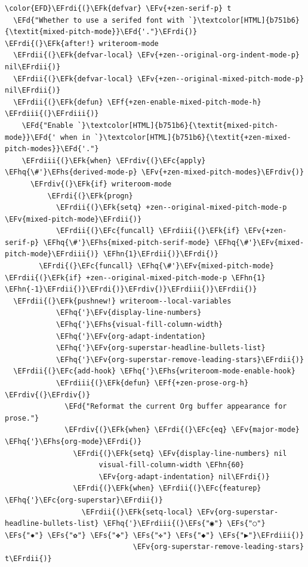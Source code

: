 \documentclass{scrartcl}
\newcommand{\EFk}[1]{\textcolor{EFk}{#1}} %
\newcommand{\EFd}[1]{\textcolor{EFd}{\textit{#1}}} %
\newcommand{\EFs}[1]{\textcolor{EFs}{#1}} %
\newcommand{\EFc}[1]{\textcolor{EFc}{#1}} %
\newcommand{\EFv}[1]{\textcolor{EFv}{#1}} %
\newcommand{\EFf}[1]{\textcolor{EFf}{#1}} %
\newcommand{\EFhn}[1]{\textcolor{EFhn}{\textbf{#1}}} %
\newcommand{\EFhq}[1]{\textcolor{EFhq}{#1}} %
\newcommand{\EFhs}[1]{\textcolor{EFhs}{#1}} %
\newcommand{\EFrdi}[1]{\textcolor{EFrdi}{#1}} %
\newcommand{\EFrdii}[1]{\textcolor{EFrdii}{#1}} %
\newcommand{\EFrdiii}[1]{\textcolor{EFrdiii}{#1}} %
\newcommand{\EFrdiv}[1]{\textcolor{EFrdiv}{#1}} %
\begin{document}
\begin{Code}
\begin{Verbatim}[]
\color{EFD}\EFrdi{(}\EFk{defvar} \EFv{+zen-serif-p} t
  \EFd{"Whether to use a serifed font with `}\textcolor[HTML]{b751b6}{\textit{mixed-pitch-mode}}\EFd{'."}\EFrdi{)}
\EFrdi{(}\EFk{after!} writeroom-mode
  \EFrdii{(}\EFk{defvar-local} \EFv{+zen--original-org-indent-mode-p} nil\EFrdii{)}
  \EFrdii{(}\EFk{defvar-local} \EFv{+zen--original-mixed-pitch-mode-p} nil\EFrdii{)}
  \EFrdii{(}\EFk{defun} \EFf{+zen-enable-mixed-pitch-mode-h} \EFrdiii{(}\EFrdiii{)}
    \EFd{"Enable `}\textcolor[HTML]{b751b6}{\textit{mixed-pitch-mode}}\EFd{' when in `}\textcolor[HTML]{b751b6}{\textit{+zen-mixed-pitch-modes}}\EFd{'."}
    \EFrdiii{(}\EFk{when} \EFrdiv{(}\EFc{apply} \EFhq{\#'}\EFhs{derived-mode-p} \EFv{+zen-mixed-pitch-modes}\EFrdiv{)}
      \EFrdiv{(}\EFk{if} writeroom-mode
          \EFrdi{(}\EFk{progn}
            \EFrdii{(}\EFk{setq} +zen--original-mixed-pitch-mode-p \EFv{mixed-pitch-mode}\EFrdii{)}
            \EFrdii{(}\EFc{funcall} \EFrdiii{(}\EFk{if} \EFv{+zen-serif-p} \EFhq{\#'}\EFhs{mixed-pitch-serif-mode} \EFhq{\#'}\EFv{mixed-pitch-mode}\EFrdiii{)} \EFhn{1}\EFrdii{)}\EFrdi{)}
        \EFrdi{(}\EFc{funcall} \EFhq{\#'}\EFv{mixed-pitch-mode} \EFrdii{(}\EFk{if} +zen--original-mixed-pitch-mode-p \EFhn{1} \EFhn{-1}\EFrdii{)}\EFrdi{)}\EFrdiv{)}\EFrdiii{)}\EFrdii{)}
  \EFrdii{(}\EFk{pushnew!} writeroom--local-variables
            \EFhq{'}\EFv{display-line-numbers}
            \EFhq{'}\EFhs{visual-fill-column-width}
            \EFhq{'}\EFv{org-adapt-indentation}
            \EFhq{'}\EFv{org-superstar-headline-bullets-list}
            \EFhq{'}\EFv{org-superstar-remove-leading-stars}\EFrdii{)}
  \EFrdii{(}\EFc{add-hook} \EFhq{'}\EFhs{writeroom-mode-enable-hook}
            \EFrdiii{(}\EFk{defun} \EFf{+zen-prose-org-h} \EFrdiv{(}\EFrdiv{)}
              \EFd{"Reformat the current Org buffer appearance for prose."}
              \EFrdiv{(}\EFk{when} \EFrdi{(}\EFc{eq} \EFv{major-mode} \EFhq{'}\EFhs{org-mode}\EFrdi{)}
                \EFrdi{(}\EFk{setq} \EFv{display-line-numbers} nil
                      visual-fill-column-width \EFhn{60}
                      \EFv{org-adapt-indentation} nil\EFrdi{)}
                \EFrdi{(}\EFk{when} \EFrdii{(}\EFc{featurep} \EFhq{'}\EFc{org-superstar}\EFrdii{)}
                  \EFrdii{(}\EFk{setq-local} \EFv{org-superstar-headline-bullets-list} \EFhq{'}\EFrdiii{(}\EFs{"◉"} \EFs{"○"} \EFs{"✸"} \EFs{"✿"} \EFs{"✤"} \EFs{"✜"} \EFs{"◆"} \EFs{"▶"}\EFrdiii{)}
                              \EFv{org-superstar-remove-leading-stars} t\EFrdii{)}

\end{Verbatim}
\end{Code}
\end{document}
